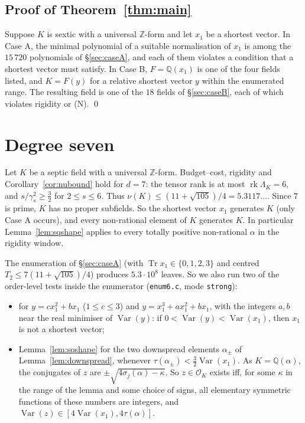 \documentclass[11pt]{amsart}
\theoremstyle{definition}
\DeclareMathOperator{\Tr}{Tr}
\DeclareMathOperator{\Var}{Var}
\DeclareMathOperator{\rk}{rk}
\newcommand{\OK}{\mathcal{O}_K}
\newcommand{\Q}{\mathbb{Q}}
\newcommand{\Z}{\mathbb{Z}}
\newcommand{\LamK}{\Lambda_K}
\newcommand{\file}[1]{\texttt{#1}}
\begin{document}
\subsection{Proof of Theorem~\ref{thm:main}}
Suppose $K$ is sextic with a universal $\Z$-form and let $x_1$ be a shortest vector.  In
Case A, the minimal polynomial of a suitable normalisation of $x_1$ is among the
$15\,720$ polynomials of \S\ref{sec:caseA}, and each of them violates a condition that a
shortest vector must satisfy.  In Case B, $F=\Q(x_1)$ is one of the four fields listed, and
$K=F(y)$ for a relative shortest vector $y$ within the enumerated range.  The resulting field
is one of the $18$ fields of \S\ref{sec:caseB}, each of which violates rigidity or (N).
\qed

\section{Degree seven}\label{sec:deg7}

Let $K$ be a septic field with a universal $\Z$-form.  Budget--cost, rigidity and
Corollary~\ref{cor:nubound} hold for $d=7$: the tensor rank is at most $\rk\LamK=6$, and
$s/\gamma_s^2\ge\frac32$ for $2\le s\le6$.  Thus $\nu(K)\le(11+\sqrt{105})/4=5.3117\ldots$.
Since $7$ is prime, $K$ has no proper subfields.  So the shortest vector $x_1$ generates $K$
(only Case A occurs), and every non-rational element of $K$ generates $K$.  In particular
Lemma~\ref{lem:sqshape} applies to every totally positive non-rational $\alpha$ in the rigidity
window.

The enumeration of \S\ref{sec:caseA} (with $\Tr x_1\in\{0,1,2,3\}$ and centred
$T_2\le7(11+\sqrt{105})/4$) produces $5.3\cdot10^8$ leaves.  So we also run two of the
order-level tests inside the enumerator (\file{enum6.c}, mode \texttt{strong}):
\begin{itemize}[leftmargin=*]
\item[(NS)] for $y=cx_1^2+bx_1$ ($1\le c\le3$) and $y=x_1^3+ax_1^2+bx_1$, with the integers
  $a,b$ near the real minimiser of $\Var(y)$: if $0<\Var(y)<\Var(x_1)$, then $x_1$ is not a
  shortest vector;
\item[(RIG)] Lemma~\ref{lem:sqshape} for the two downspread elements $\alpha_\pm$ of
  Lemma~\ref{lem:downspread}, whenever $\tau(\alpha_\pm)<\frac32\Var(x_1)$.  As $K=\Q(\alpha)$,
  the conjugates of $z$ are $\pm\sqrt{4\sigma_j(\alpha)-\kappa}$.  So $z\in\OK$ exists iff, for
  some $\kappa$ in the range of the lemma and some choice of signs, all elementary symmetric
  functions of these numbers are integers, and $\Var(z)\in[4\Var(x_1),4\tau(\alpha)]$.
\end{itemize}
\end{document}
